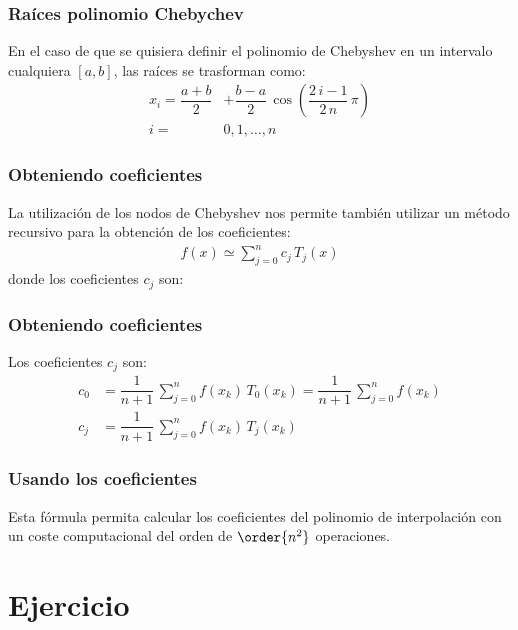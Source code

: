 \begin{frame}
\frametitle{Raíces polinomio Chebychev}
En el caso de que se quisiera definir el polinomio de Chebyshev en un intervalo cualquiera $[a, b]$, las raíces se trasforman como:
\begin{align*}
x_{i} = \dfrac{a + b}{2} &+ \dfrac{b - a}{2} \, \cos \left( \dfrac{2 \, i - 1}{2 \, n} \, \pi \right) \\[0.5em] 
i =& 0, 1, \ldots, n
\end{align*}
\end{frame}
\begin{frame}
\frametitle{Obteniendo coeficientes}
La utilización de los nodos de Chebyshev nos permite también utilizar un método recursivo para la obtención de los coeficientes:
\begin{align*}
f(x) \simeq \sum_{j=0}^{n} c_{j} \, T_{j}(x)
\end{align*}
donde los coeficientes $c_{j}$ son:
\end{frame}
\begin{frame}
\frametitle{Obteniendo coeficientes}
Los coeficientes $c_{j}$ son:
\begin{align*}
c_{0} &= \dfrac{1}{n + 1} \, \sum_{j=0}^{n} f(x_{k}) \, T_{0}(x_{k}) = \dfrac{1}{n + 1} \, \sum_{j=0}^{n} f(x_{k}) \\[0.5em]
c_{j} &= \dfrac{1}{n + 1} \, \sum_{j=0}^{n} f(x_{k}) \, T_{j}(x_{k})
\end{align*}
\end{frame}
\begin{frame}
\frametitle{Usando los coeficientes}
Esta fórmula permita calcular los coeficientes del polinomio de interpolación con un coste computacional del orden de $\order{n^{2}}$ operaciones.
\end{frame}
\section{Ejercicio}
